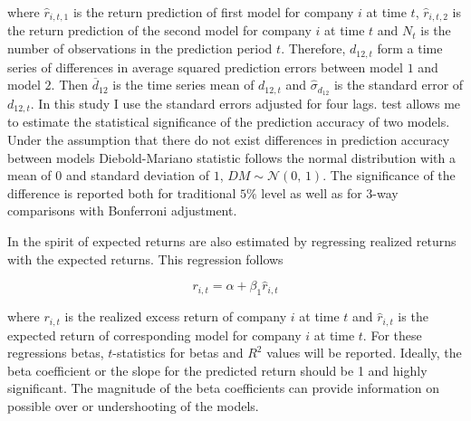 \documentclass[12pt]{article}
\begin{document}
where $\hat r_{i, t, 1}$ is the return prediction of first model for company $i$ at time $t$, $\hat r_{i, t, 2}$ is the return prediction of the second model  for company $i$ at time $t$ and $N_t$ is the number of observations in the prediction period $t$.\footnotemark {} Therefore, $d_{12, t}$ form a time series of differences in average squared prediction errors between model $1$ and model $2$. Then $\overline{d}_{12}$ is the time series mean of $d_{12, t}$ and $\hat \sigma_{d_{12}}$ is the \citet{Newey1987} standard error of $d_{12, t}$.\footnotemark {} In this study I use the \citeauthor{Newey1987} standard errors adjusted for four lags. \citet{Diebold1995} test allows me to estimate the statistical significance of the prediction accuracy of two models. Under the assumption that there do not exist differences in prediction accuracy between models Diebold-Mariano statistic follows the normal distribution with a mean of $0$ and standard deviation of $1$, $DM \sim \mathcal{N}(0,\, 1)$. The significance of the difference is reported both for traditional $5\%$ level as well as for 3-way comparisons with Bonferroni adjustment. \par

In the spirit of \citet{Lewellen2015} expected returns are also estimated by regressing realized returns with the expected returns. This regression follows \par

\begin{equation}
\label{eq:realizedRegression}
r_{i, t} = \alpha + \beta_1 \hat r_{i, t}
\end{equation}

where $r_{i, t}$ is the realized excess return of company $i$ at time $t$ and $\hat r_{i, t}$ is the expected return of corresponding model for company $i$ at time $t$.\footnotemark {} For these regressions betas, $t$-statistics for betas and $R^2$ values will be reported. Ideally, the beta coefficient or the slope for the predicted return should be 1 and highly significant. The magnitude of the beta coefficients can provide information on possible over or undershooting of the models. \par
\end{document}
